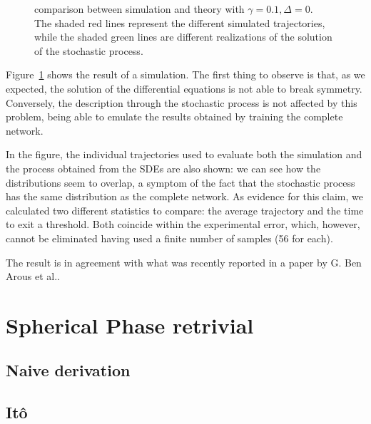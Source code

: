 \begin{figure}
  \caption{
    comparison between simulation and theory with \(\gamma=\num{0.1}, \Delta=0\).\\
    The shaded red lines represent the different simulated trajectories,
    while the shaded green lines are different realizations of the solution of the stochastic process.
  }
  \label{fig:unconstrainted-sde}
\end{figure}
Figure~\ref{fig:unconstrainted-sde} shows the result of a simulation.
The first thing to observe is that, as we expected, the solution of the differential equations is not able to break symmetry.
Conversely, the description through the stochastic process is not affected by this problem,
being able to emulate the results obtained by training the complete network.

In the figure, the individual trajectories used to evaluate both the simulation and the process obtained from the SDEs are also shown:
we can see how the distributions seem to overlap, a symptom of the fact that the stochastic process has the same distribution as the complete network.
As evidence for this claim, we calculated two different statistics to compare:
the average trajectory and the time to exit a threshold.
Both coincide within the experimental error, which, however, cannot be eliminated having used a finite number of samples (56 for each).

The result is in agreement with what was recently reported in a paper by G. Ben Arous et al.\cite{arous2022high}.

\section{Spherical Phase retrivial}
\subsection{Naive derivation}
\subsection{Itô}



